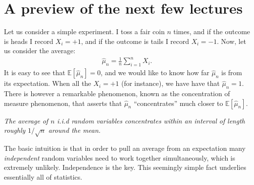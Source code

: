 \documentclass[twoside,12pt]{article}
\begin{document}
\section{A preview of the next few lectures}
Let us consider a simple experiment. I toss a fair coin $n$ times, and if the outcome is heads I record $X_i = +1$, and if the outcome is tails I record $X_i = -1$. Now, let us consider the average:
\begin{align*}
\widehat{\mu}_n = \frac{1}{n} \sum_{i=1}^n X_i.
\end{align*}
It is easy to see that $\mathbb{E}[\widehat{\mu}_n] = 0$, and we would like to know how far $\widehat{\mu}_n$ is from its expectation. When all the $X_i = +1$ (for instance), we have have that $\widehat{\mu}_n = 1$. There is however a remarkable phenomenon, known as the concentration of measure phenomenon, that asserts that $\widehat{\mu}_n$ ``concentrates'' much closer to $\mathbb{E}[\widehat{\mu}_n]$.

\begin{center}
{\it The average of $n$ i.i.d random variables concentrates within an interval of length roughly $1/\sqrt{n}$ around the mean. }
\end{center}

The basic intuition is that in order to pull an average from an expectation many \emph{independent} random variables need to work together simultaneously, which is extremely unlikely. Independence is the key. This seemingly simple fact underlies essentially all of statistics.
\end{document}
